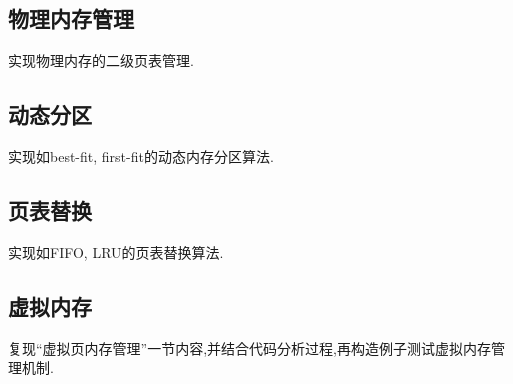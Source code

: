 \subsection{物理内存管理}
实现物理内存的二级页表管理.
\subsection{动态分区}
实现如best-fit, first-fit的动态内存分区算法.
\subsection{页表替换}
实现如FIFO, LRU的页表替换算法.
\subsection{虚拟内存}
复现``虚拟页内存管理''一节内容,并结合代码分析过程,再构造例子测试虚拟内存管理机制.
